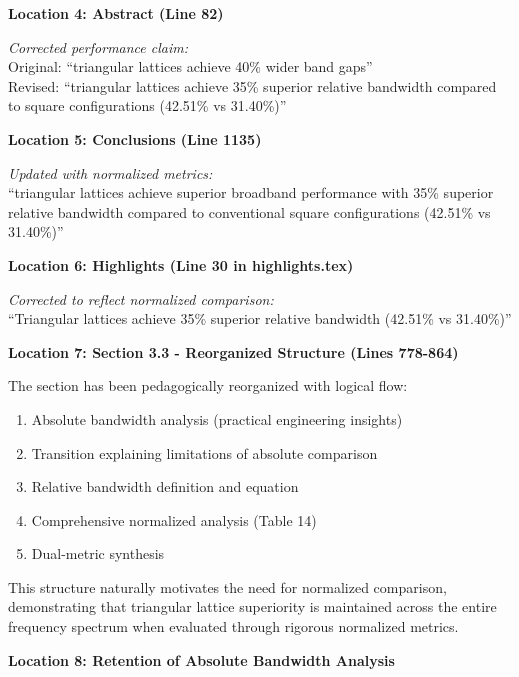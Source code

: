 \documentclass[11pt,a4paper]{article}
\newenvironment{changesbox}{%
    \par\medskip\noindent{\color{changescolor}\rule{\linewidth}{2pt}}\par
    \noindent{\color{changescolor}\bfseries Manuscript Changes}\par\smallskip
}{%
    \par\noindent{\color{changescolor}\rule{\linewidth}{0.5pt}}\medskip
}
\begin{document}
\begin{changesbox}
\textbf{Location 4: Abstract (Line 82)}

\textit{Corrected performance claim:}\\
Original: ``triangular lattices achieve 40\% wider band gaps''\\
Revised: \textcolor{redtext}{``triangular lattices achieve 35\% superior relative bandwidth compared to square configurations (42.51\% vs 31.40\%)''}

\textbf{Location 5: Conclusions (Line 1135)}

\textit{Updated with normalized metrics:}\\
\textcolor{redtext}{``triangular lattices achieve superior broadband performance with 35\% superior relative bandwidth compared to conventional square configurations (42.51\% vs 31.40\%)''}

\textbf{Location 6: Highlights (Line 30 in highlights.tex)}

\textit{Corrected to reflect normalized comparison:}\\
\textcolor{redtext}{``Triangular lattices achieve 35\% superior relative bandwidth (42.51\% vs 31.40\%)''}

\textbf{Location 7: Section 3.3 - Reorganized Structure (Lines 778-864)}

The section has been pedagogically reorganized with logical flow:
\begin{enumerate}
    \item Absolute bandwidth analysis (practical engineering insights)
    \item Transition explaining limitations of absolute comparison
    \item Relative bandwidth definition and equation
    \item Comprehensive normalized analysis (Table 14)
    \item Dual-metric synthesis
\end{enumerate}

This structure naturally motivates the need for normalized comparison, demonstrating that triangular lattice superiority is maintained across the entire frequency spectrum when evaluated through rigorous normalized metrics.

\textbf{Location 8: Retention of Absolute Bandwidth Analysis}


\end{changesbox}
\end{document}
